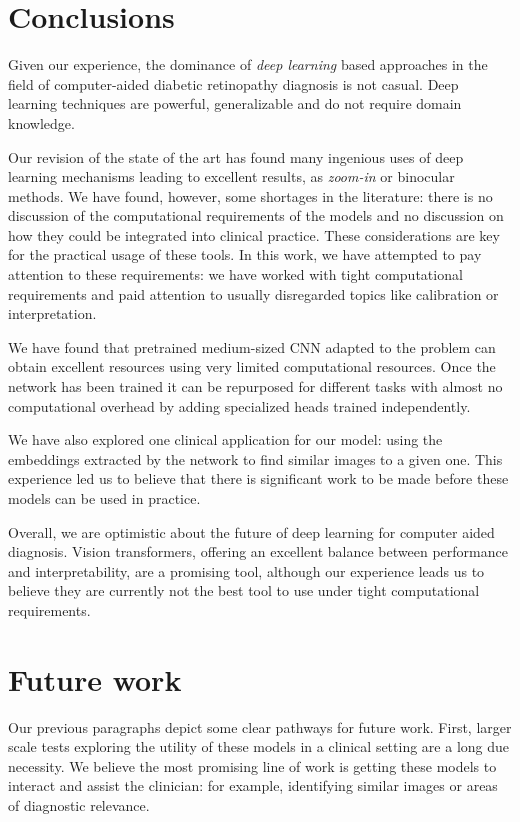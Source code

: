 \section{Conclusions}
Given our experience, the dominance of \textit{deep learning} based approaches in the field of computer-aided diabetic retinopathy diagnosis is not casual. Deep learning techniques are powerful, generalizable and do not require domain knowledge.

Our revision of the state of the art has found many ingenious uses of deep learning mechanisms leading to excellent results, as \textit{zoom-in} or binocular methods. We have found, however, some shortages in the literature: there is no discussion of the computational requirements of the models and no discussion on how they could be integrated into clinical practice. These considerations are key for the practical usage of these tools. In this work, we have attempted to pay attention to these requirements: we have worked with tight computational requirements and paid attention to usually disregarded topics like calibration or interpretation.

We have found that pretrained medium-sized CNN adapted to the problem can obtain excellent resources using very limited computational resources. Once the network has been trained it can be repurposed for different tasks with almost no computational overhead by adding specialized heads trained independently.

We have also explored one clinical application for our model: using the embeddings extracted by the network to find similar images to a given one. This experience led us to believe that there is significant work to be made before these models can be used in practice. 

Overall, we are optimistic about the future of deep learning for computer aided diagnosis. Vision transformers, offering an excellent balance between performance and interpretability, are a promising tool, although our experience leads us to believe they are currently not the best tool to use under tight computational requirements.

\section{Future work}
Our previous paragraphs depict some clear pathways for future work. First, larger scale tests exploring the utility of these models in a clinical setting are a long due necessity. We believe the most promising line of work is getting these models to interact and assist the clinician: for example, identifying similar images or areas of diagnostic relevance. 

